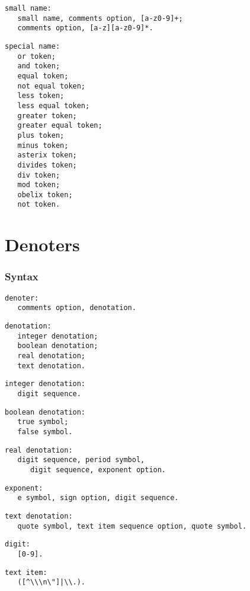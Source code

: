 \documentclass [a4paper,12pt,fleqn]{article}
\begin{document}
\begin{letterlist}
\begin{verbatim}
\end{verbatim}
\item
\begin{verbatim}
small name:
   small name, comments option, [a-z0-9]+;
   comments option, [a-z][a-z0-9]*.
\end{verbatim}
\item
\begin{verbatim}
special name:
   or token;
   and token;
   equal token;
   not equal token;
   less token;
   less equal token;
   greater token;
   greater equal token;
   plus token;
   minus token;
   asterix token;
   divides token;
   div token;
   mod token;
   obelix token;
   not token.
\end{verbatim}
\end{letterlist}
\section {Denoters}
\subsubsection*{Syntax}
\begin{letterlist}
\item
\begin{verbatim}
denoter:
   comments option, denotation.
\end{verbatim}
\item
\begin{verbatim}
denotation:
   integer denotation;
   boolean denotation;
   real denotation;
   text denotation.
\end{verbatim}
\item
\begin{verbatim}
integer denotation:
   digit sequence.
\end{verbatim}
\item
\begin{verbatim}
boolean denotation:
   true symbol;
   false symbol.
\end{verbatim}
\item
\begin{verbatim}
real denotation:
   digit sequence, period symbol,
      digit sequence, exponent option.
\end{verbatim}
\item
\begin{verbatim}
exponent:
   e symbol, sign option, digit sequence.
\end{verbatim}
\item
\begin{verbatim}
text denotation:
   quote symbol, text item sequence option, quote symbol.
\end{verbatim}
\item
\begin{verbatim}
digit:
   [0-9].
\end{verbatim}
\item
\begin{verbatim}
text item:
   ([^\\\n\"]|\\.).
\end{verbatim}
\end{letterlist}
\end{document}
